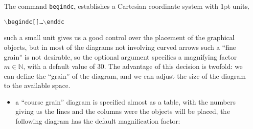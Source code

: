 \documentclass{europroc}
\begin{document}
The command {\tt begindc}, establishes a Cartesian coordinate system
with 1pt units,

\begin{alltt}
  \(\backslash\)begindc[{\em<magnification factor>}] \dots \(\backslash\)enddc
\end{alltt}
such a small unit gives us a good control over the placement of the
graphical objects, but in most of the diagrams not involving curved
arrows such a ``fine grain'' is not desirable, so the optional
argument specifies a magnifying factor $m\in\mathds{N}$, with a default
value of 30. The advantage of this decision is twofold: we can define
the ``grain'' of the diagram, and we can adjust the size of the
diagram to the available space.
\begin{itemize}
\item a ``course grain'' diagram is specified almost as a table, with
the numbers giving us the lines and the columns were the objects will
be placed, the following diagram has the default magnification factor:


\end{itemize}
\end{document}
